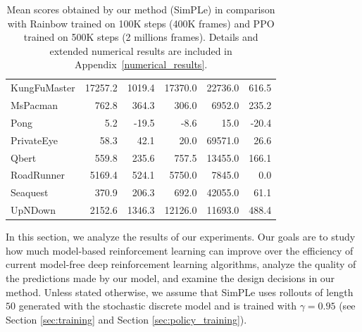 \begin{table}
\begin{tabular}{l|r|r|r|r|r}
KungFuMaster   &  17257.2 &   1019.4 &  17370.0 &  22736.0 &   616.5 \\
MsPacman       &    762.8 &    364.3 &    306.0 &   6952.0 &   235.2 \\
Pong           &      5.2 &    -19.5 &     -8.6 &     15.0 &   -20.4 \\
PrivateEye     &     58.3 &     42.1 &     20.0 &  69571.0 &    26.6 \\
Qbert          &    559.8 &    235.6 &    757.5 &  13455.0 &   166.1 \\
RoadRunner     &   5169.4 &    524.1 &   5750.0 &   7845.0 &     0.0 \\
Seaquest       &    370.9 &    206.3 &    692.0 &  42055.0 &    61.1 \\
UpNDown        &   2152.6 &   1346.3 &  12126.0 &  11693.0 &   488.4 \\

\end{tabular}
\caption{Mean scores obtained by our method (SimPLe) in comparison with Rainbow trained on 100K steps (400K frames) and PPO trained on 500K steps (2 millions frames). Details and extended numerical results are included in Appendix~\ref{numerical_results}.}
\label{tab:shortNumericalResults}
\end{table}

In this section, we analyze the results of our experiments. Our goals are to study how much model-based reinforcement learning can improve over the efficiency of current model-free deep reinforcement learning algorithms, analyze the quality of the predictions made by our model, and examine the design decisions in our method. Unless stated otherwise, we assume that SimPLe uses rollouts of length $50$ generated with the stochastic discrete model and is trained with $\gamma=0.95$ (see Section \ref{sec:training} and Section \ref{sec:policy_training}).

